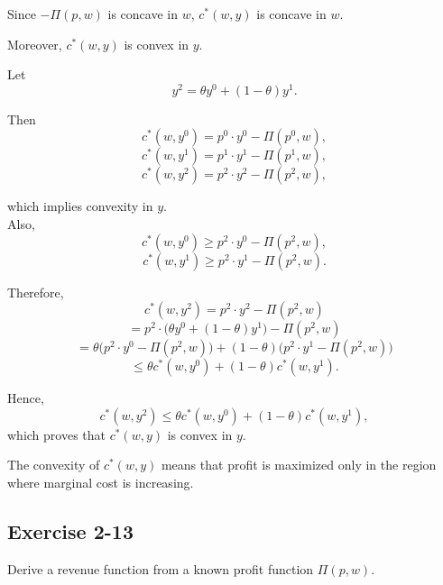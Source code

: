 Since $-\Pi(p,w)$ is concave in $w$, $c^*(w,y)$ is concave in $w$.

Moreover, $c^*(w,y)$ is convex in $y$.

Let
\[
y^2=\theta y^0 + (1-\theta)y^1.
\]

Then
\[
c^*(w,y^0)=p^0\cdot y^0 - \Pi(p^0,w),
\]
\[
c^*(w,y^1)=p^1\cdot y^1 - \Pi(p^1,w),
\]
\[
c^*(w,y^2)=p^2\cdot y^2 - \Pi(p^2,w),
\]

which implies convexity in $y$.\\



Also,
\[
c^*(w,y^0) \ge p^2 \cdot y^0 - \Pi(p^2,w),
\]
\[
c^*(w,y^1) \ge p^2 \cdot y^1 - \Pi(p^2,w).
\]

Therefore,
\[
c^*(w,y^2)
=
p^2 \cdot y^2 - \Pi(p^2,w)
\]
\[
=
p^2 \cdot \bigl(\theta y^0 + (1-\theta)y^1\bigr) - \Pi(p^2,w)
\]
\[
=
\theta \bigl(p^2 \cdot y^0 - \Pi(p^2,w)\bigr)
+
(1-\theta)\bigl(p^2 \cdot y^1 - \Pi(p^2,w)\bigr)
\]
\[
\le
\theta c^*(w,y^0) + (1-\theta)c^*(w,y^1).
\]

Hence,
\[
c^*(w,y^2)
\le
\theta c^*(w,y^0) + (1-\theta)c^*(w,y^1),
\]
which proves that $c^*(w,y)$ is convex in $y$.

\medskip

The convexity of $c^*(w,y)$ means that profit is maximized only in the region
where marginal cost is increasing.


\begin{tcolorbox}[breakable]

\subsection*{Exercise 2-13}

Derive a revenue function from a known profit function $\Pi(p,w)$.

\end{tcolorbox}


